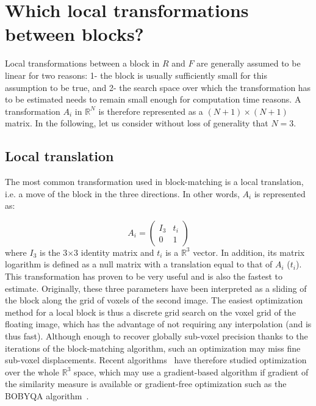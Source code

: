 \documentclass[a4paper]{article}
\begin{document}
\section{Which local transformations between blocks?}
\label{sec:local_trsfs_blocks}

Local transformations between a block in $R$ and $F$ are generally assumed to be linear for two reasons: 1- the block is usually sufficiently small for this assumption to be true, and 2- the search space over which the transformation has to be estimated needs to remain small enough for computation time reasons. A transformation $A_i$ in $\mathbb{R}^N$ is therefore represented as a $(N+1)\times(N+1)$ matrix. In the following, let us consider without loss of generality that $N=3$.

\subsection{Local translation}

The most common transformation used in block-matching is a local translation, i.e. a move of the block in the three directions. In other words, $A_i$ is represented as:

\begin{equation}
	A_i = \begin{pmatrix} I_3 & t_i \\ 0 & 1 \end{pmatrix}
\end{equation}
where $I_3$ is the 3$\times$3 identity matrix and $t_i$ is a $\mathbb{R}^3$ vector. In addition, its matrix logarithm is defined as a null matrix with a translation equal to that of $A_i$ ($t_i$). This transformation has proven to be very useful and is also the fastest to estimate. Originally, these three parameters have been interpreted as a sliding of the block along the grid of voxels of the second image. The easiest optimization method for a local block is thus a discrete grid search on the voxel grid of the floating image, which has the advantage of not requiring any interpolation (and is thus fast). Although enough to recover globally sub-voxel precision thanks to the iterations of the block-matching algorithm, such an optimization may miss fine sub-voxel displacements. Recent algorithms~\cite{commowick:inserm-00681610} have therefore studied optimization over the whole $\mathbb{R}^3$ space, which may use a gradient-based algorithm if gradient of the similarity measure is available or gradient-free optimization such as the BOBYQA algorithm~\cite{Powell09a}.
\end{document}
